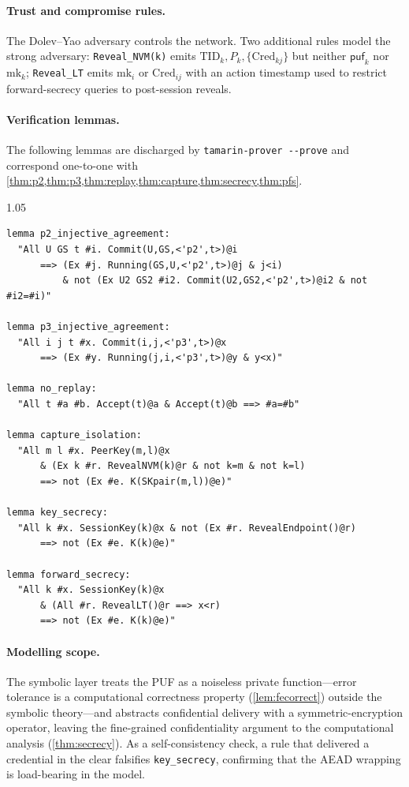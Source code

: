 \documentclass[11pt,a4paper]{article}
\theoremstyle{jrnlplain}
\theoremstyle{jrnldef}
\newcommand{\TID}{\mathrm{TID}}
\newcommand{\Cred}{\mathrm{Cred}}
\newcommand{\mk}{\mathrm{mk}}
\begin{document}
\paragraph{Trust and compromise rules.}
The Dolev--Yao adversary controls the network. Two additional rules model the
strong adversary: \texttt{Reveal\_NVM(k)} emits $\TID_k,P_k,\{\Cred_{kj}\}$ but
neither $\mathsf{puf}_k$ nor $\mk_k$; \texttt{Reveal\_LT} emits $\mk_i$ or
$\Cred_{ij}$ with an action timestamp used to restrict forward-secrecy queries
to post-session reveals.

\paragraph{Verification lemmas.}
The following lemmas are discharged by \texttt{tamarin-prover -{}-prove} and
correspond one-to-one with \cref{thm:p2,thm:p3,thm:replay,thm:capture,thm:secrecy,thm:pfs}.
\begin{spacing}{1.05}
\begin{verbatim}
lemma p2_injective_agreement:
  "All U GS t #i. Commit(U,GS,<'p2',t>)@i
      ==> (Ex #j. Running(GS,U,<'p2',t>)@j & j<i)
          & not (Ex U2 GS2 #i2. Commit(U2,GS2,<'p2',t>)@i2 & not #i2=#i)"

lemma p3_injective_agreement:
  "All i j t #x. Commit(i,j,<'p3',t>)@x
      ==> (Ex #y. Running(j,i,<'p3',t>)@y & y<x)"

lemma no_replay:
  "All t #a #b. Accept(t)@a & Accept(t)@b ==> #a=#b"

lemma capture_isolation:
  "All m l #x. PeerKey(m,l)@x
      & (Ex k #r. RevealNVM(k)@r & not k=m & not k=l)
      ==> not (Ex #e. K(SKpair(m,l))@e)"

lemma key_secrecy:
  "All k #x. SessionKey(k)@x & not (Ex #r. RevealEndpoint()@r)
      ==> not (Ex #e. K(k)@e)"

lemma forward_secrecy:
  "All k #x. SessionKey(k)@x
      & (All #r. RevealLT()@r ==> x<r)
      ==> not (Ex #e. K(k)@e)"
\end{verbatim}
\end{spacing}

\paragraph{Modelling scope.}
The symbolic layer treats the PUF as a noiseless private function---error
tolerance is a computational correctness property (\cref{lem:fecorrect})
outside the symbolic theory---and abstracts confidential delivery with a
symmetric-encryption operator, leaving the fine-grained confidentiality
argument to the computational analysis (\cref{thm:secrecy}). As a
self-consistency check, a rule that delivered a credential in the clear
falsifies \texttt{key\_secrecy}, confirming that the AEAD wrapping is
load-bearing in the model.
\end{document}
